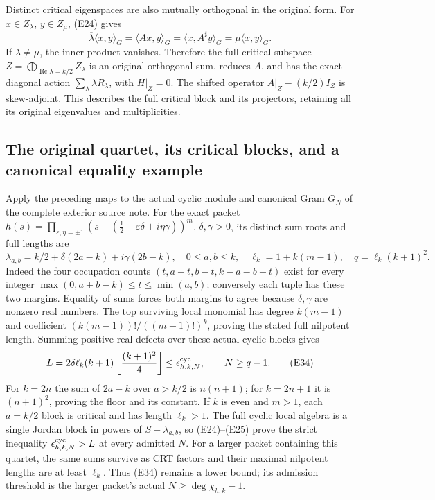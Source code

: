 Distinct critical eigenspaces are also mutually orthogonal in the original form. For \(x\in Z_\lambda\), \(y\in Z_\mu\), (E24) gives
\[
\overline\lambda\langle x,y\rangle_G
=\langle Ax,y\rangle_G
=\langle x,A^\sharp y\rangle_G
=\overline\mu\langle x,y\rangle_G.
\]
If \(\lambda\ne\mu\), the inner product vanishes. Therefore the full critical subspace \(Z=\bigoplus_{\operatorname{Re}\lambda=k/2}Z_\lambda\) is an original orthogonal sum, reduces \(A\), and has the exact diagonal action \(\sum_\lambda\lambda R_\lambda\), with \(H|_Z=0\). The shifted operator \(A|_Z-(k/2)I_Z\) is skew-adjoint. This describes the full critical block and its projectors, retaining all its original eigenvalues and multiplicities.

\subsection{The original quartet, its critical blocks, and a canonical equality example}

Apply the preceding maps to the actual cyclic module and canonical
Gram $G_N$ of the complete exterior source note. For the exact packet
$h(s)=\prod_{\varepsilon,\eta=\pm1}
(s-(\frac12+\varepsilon\delta+i\eta\gamma))^m$,
$\delta,\gamma>0$, its distinct sum roots and full lengths are
\[
 \lambda_{a,b}=k/2+\delta(2a-k)+i\gamma(2b-k),\quad
 0\le a,b\le k,\quad \ell_k=1+k(m-1),\quad
 q=\ell_k(k+1)^2.
 \tag{E33}
\]
Indeed the four occupation counts
$(t,a-t,b-t,k-a-b+t)$ exist for every integer
$\max(0,a+b-k)\le t\le\min(a,b)$; conversely each tuple has these
two margins. Equality of sums forces both margins to agree because
$\delta,\gamma$ are nonzero real numbers. The top surviving local
monomial has degree $k(m-1)$ and coefficient
$(k(m-1))!/((m-1)!)^k$, proving the stated full nilpotent length.
Summing positive real defects over these actual cyclic blocks gives
\[
 L=2\delta\ell_k(k+1)\left\lfloor\frac{(k+1)^2}{4}\right\rfloor
 \le\epsilon_{h,k,N}^{\rm cyc},\qquad N\ge q-1.
 \tag{E34}
\]
For $k=2n$ the sum of $2a-k$ over $a>k/2$ is $n(n+1)$;
for $k=2n+1$ it is $(n+1)^2$, proving the floor and its constant.
If $k$ is even and $m>1$, each $a=k/2$ block is critical and has
length $\ell_k>1$. The full cyclic local algebra is a single
Jordan block in powers of $S-\lambda_{a,b}$, so (E24)--(E25)
prove the strict inequality $\epsilon_{h,k,N}^{\rm cyc}>L$
at every admitted $N$. For a larger packet containing this quartet,
the same sums survive as CRT factors and their maximal nilpotent
lengths are at least $\ell_k$. Thus (E34) remains a lower bound;
its admission threshold is the larger packet's actual
$N\ge\deg\chi_{h,k}-1$.

